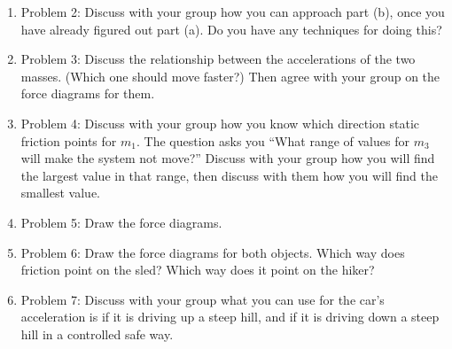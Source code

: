 \documentclass[12pt]{article}
\begin{document}
\begin{enumerate}[label=(\alph*)]
	\item Problem 2: Discuss with your group how you can approach part (b), once you have already figured out part (a). Do you have any techniques for doing this?
	\item Problem 3: Discuss the relationship between the accelerations of the two masses. (Which one should move faster?) Then agree with your group on the force diagrams for them. 
	\item Problem 4: Discuss with your group how you know which direction static friction points for $m_1$. The question asks you ``What range of values for $m_3$ will make the system not move?'' Discuss with your group how you will find the largest value in that range, then discuss with them how you will find the smallest value.
	\item Problem 5: Draw the force diagrams. 
	\item Problem 6: Draw the force diagrams for both objects. Which way does friction point on the sled? Which way does it point on the hiker?
	\item Problem 7: Discuss with your group what you can use for the car's acceleration is if it is driving up a steep hill, and if it is driving down a steep hill in a controlled safe way.
\end{enumerate}
\end{document}
